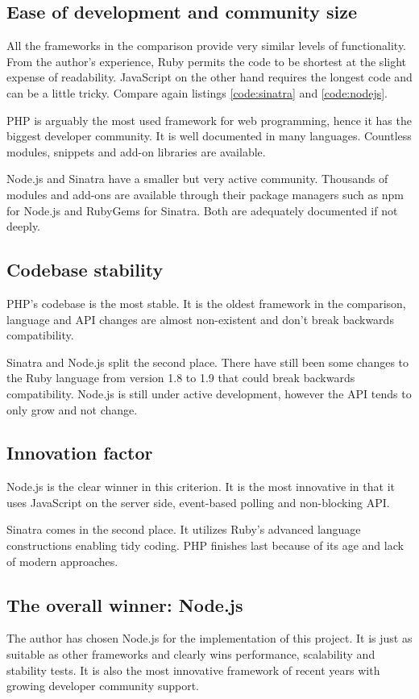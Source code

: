 \documentclass[12pt,oneside]{fithesis}
\begin{document}
	\subsection{Ease of development and community size}
		All the frameworks in the comparison provide very similar levels of functionality. From the author's experience, Ruby permits the code to be shortest at the slight expense of readability. JavaScript on the other hand requires the longest code and can be a little tricky. Compare again listings \ref{code:sinatra} and \ref{code:nodejs}.
		
		PHP is arguably the most used framework for web programming, hence it has the biggest developer community. It is well documented in many languages. Countless modules, snippets and add-on libraries are available.
		
		Node.js and Sinatra have a smaller but very active community. Thousands of modules and add-ons are available through their package managers such as npm for Node.js and RubyGems for Sinatra. Both are adequately documented if not deeply. 
		
	\subsection{Codebase stability}
		PHP's codebase is the most stable. It is the oldest framework in the comparison, language and API changes are almost non-existent and don't break backwards compatibility.
		
		Sinatra and Node.js split the second place. There have still been some changes to the Ruby language from version 1.8 to 1.9 that could break backwards compatibility. Node.js is still under active development, however the API tends to only grow and not change.
		
	\subsection{Innovation factor}
		Node.js is the clear winner in this criterion. It is the most innovative in that it uses JavaScript on the server side, event-based polling and non-blocking API.
		
		Sinatra comes in the second place. It utilizes Ruby's advanced language constructions enabling tidy coding. PHP finishes last because of its age and lack of modern approaches.
		
	\subsection{The overall winner: Node.js}
		The author has chosen Node.js for the implementation of this project. It is just as suitable as other frameworks and clearly wins performance, scalability and stability tests. It is also the most innovative framework of recent years with growing developer community support.
		
\end{document}

